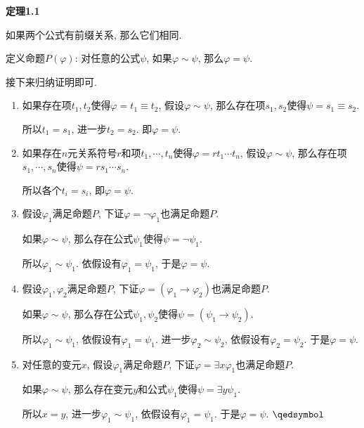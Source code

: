 \documentclass[UTF8]{ctexart}
\begin{document}
\vspace{10pt}

\hypertarget{sec:定理1.1}{}
\noindent\textbf{定理1.1}

如果两个公式有前缀关系, 那么它们相同.


定义命题$P(\varphi)$:
对任意的公式$\psi$, 如果$\varphi\sim\psi$, 那么$\varphi=\psi$.

接下来归纳证明即可.

\begin{enumerate}
    \item 如果存在项$t_1,t_2$使得$\varphi=t_1\equiv t_2$,
    假设$\varphi\sim\psi$, 那么存在项$s_1,s_2$使得$\psi=s_1\equiv s_2$.

    \hspace{2.17em}
    所以$t_1=s_1$, 进一步$t_2=s_2$. 即$\varphi=\psi$.

    \item 如果存在$n$元关系符号$r$和项$t_1,\cdots,t_n$使得$\varphi=rt_1\cdots t_n$,
    假设$\varphi\sim\psi$, 那么存在项$s_1,\cdots,s_n$使得$\psi=rs_1\cdots s_n$.

    \hspace{2.17em}
    所以各个$t_i=s_i$, 即$\varphi=\psi$.

    \item 假设$\varphi_1$满足命题$P$, 下证$\varphi=\neg\varphi_1$也满足命题$P$.
    
    \hspace{2.17em}
    如果$\varphi\sim\psi$, 那么存在公式$\psi_1$使得$\psi=\neg\psi_1$.

    \hspace{2.17em}
    所以$\varphi_1\sim\psi_1$. 依假设有$\varphi_1=\psi_1$, 于是$\varphi=\psi$.

    \item 假设$\varphi_1,\varphi_2$满足命题$P$,
    下证$\varphi=(\varphi_1\to\varphi_2)$也满足命题$P$.

    \hspace{2.17em}
    如果$\varphi\sim\psi$,
    那么存在公式$\psi_1,\psi_2$使得$\psi=(\psi_1\to\psi_2)$.

    \hspace{2.17em}
    所以$\varphi_1\sim\psi_1$, 依假设有$\varphi_1=\psi_1$.
    进一步$\varphi_2\sim\psi_2$, 依假设有$\varphi_2=\psi_2$. 于是$\varphi=\psi$.

    \item 对任意的变元$x$, 假设$\varphi_1$满足命题$P$,
    下证$\varphi=\exists x\varphi_1$也满足命题$P$.

    \hspace{2.17em}
    如果$\varphi\sim\psi$,
    那么存在变元$y$和公式$\psi_1$使得$\psi=\exists y\psi_1$.

    \hspace{2.17em}
    所以$x=y$, 进一步$\varphi_1\sim\psi_1$, 依假设有$\varphi_1=\psi_1$.
    于是$\varphi=\psi$. \hfill $\qedsymbol$
\end{enumerate}
\end{document}

